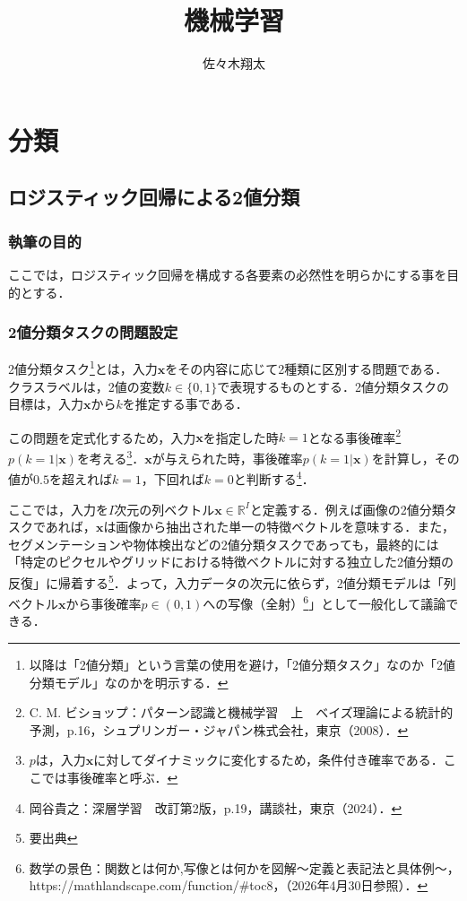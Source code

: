 \documentclass[a4paper,dvipdfmx]{jarticle}
\begin{document}
\title{機械学習}
\author{佐々木翔太}
\date{}

\maketitle

\tableofcontents %

\section{分類}

\subsection{ロジスティック回帰による2値分類}

\subsubsection{執筆の目的}
ここでは，ロジスティック回帰を構成する各要素の必然性を明らかにする事を目的とする．

\subsubsection{2値分類タスクの問題設定}
\label{define_binary_classification_task}

2値分類タスク\footnote{以降は「2値分類」という言葉の使用を避け，「2値分類タスク」なのか「2値分類モデル」なのかを明示する．}とは，入力$\bm{x}$をその内容に応じて2種類に区別する問題である．クラスラベルは，2値の変数$k \in \{0, 1\}$で表現するものとする．2値分類タスクの目標は，入力$\bm{x}$から$k$を推定する事である．

この問題を定式化するため，入力$\bm{x}$を指定した時$k=1$となる事後確率\footnote{C. M. ビショップ：パターン認識と機械学習　上　ベイズ理論による統計的予測，p.16，シュプリンガー・ジャパン株式会社，東京（2008）．}$p(k=1|\bm{x})$を考える\footnote{$p$は，入力$\bm{x}$に対してダイナミックに変化するため，条件付き確率である．ここでは事後確率と呼ぶ．}．$\bm{x}$が与えられた時，事後確率$p(k=1|\bm{x})$を計算し，その値が$0.5$を超えれば$k=1$，下回れば$k=0$と判断する\footnote{岡谷貴之：深層学習　改訂第2版，p.19，講談社，東京（2024）．}．

ここでは，入力を$I$次元の列ベクトル$\bm{x} \in \mathbb{R}^I$と定義する．例えば画像の2値分類タスクであれば，$\bm{x}$は画像から抽出された単一の特徴ベクトルを意味する．また，セグメンテーションや物体検出などの2値分類タスクであっても，最終的には「特定のピクセルやグリッドにおける特徴ベクトルに対する独立した2値分類の反復」に帰着する\footnote{要出典}．よって，入力データの次元に依らず，2値分類モデルは「列ベクトル$\bm{x}$から事後確率$p \in (0, 1)$への写像（全射）\footnote{数学の景色：関数とは何か,写像とは何かを図解～定義と表記法と具体例～，https://mathlandscape.com/function/\#toc8，（2026年4月30日参照）．}」として一般化して議論できる．
\end{document}
